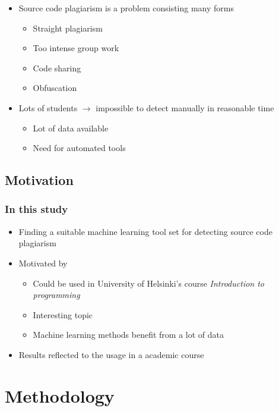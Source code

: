 \documentclass[t,12pt,pdftex]{beamer}
\begin{document}
\begin{frame}
	\vspace{1in}
	\begin{itemize}
			\item Source code plagiarism is a problem consisting many forms
		\begin{itemize}
			\item Straight plagiarism
			\item Too intense group work 
			\item Code sharing
			\item Obfuscation
		\end{itemize}
		\item Lots of students $\rightarrow$ impossible to detect manually in reasonable time
		\begin{itemize}
			\item Lot of data available
			\item Need for automated tools
		\end{itemize}
	\end{itemize}
\end{frame}

\subsection{Motivation}

\begin{frame}
	\frametitle{In this study}
	\begin{itemize}
		\item Finding a suitable machine learning tool set for detecting source code plagiarism
		\item Motivated by
		\begin{itemize}
			\item Could be used in University of Helsinki's course \textit{Introduction to programming}
			\item Interesting topic
			\item Machine learning methods benefit from a lot of data
		\end{itemize}
		\item Results reflected to the usage in a academic course
	\end{itemize}
\end{frame}




\section{Methodology}
\end{document}

